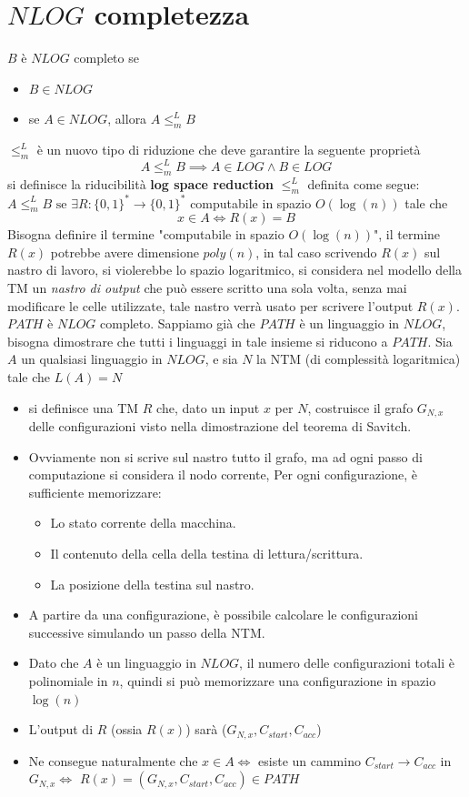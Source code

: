 \documentclass[10pt, letterpaper]{report}
\begin{document}
\section{$NLOG$ completezza}
 $B$ è $NLOG$ completo se\begin{itemize}
    \item $B\in NLOG$
    \item se $A\in NLOG$, allora $A\le_m^L B$
\end{itemize}
$\le_m^L$ è un nuovo tipo di riduzione che deve garantire la seguente proprietà
$$ A\le_m^L B\implies A\in LOG \land B\in LOG$$
 si definisce la riducibilità \textbf{log space reduction} $\le_m^L$ definita come segue:\\  
$A\le_m^L B \text{ se }\exists R:\{0,1\}^*\rightarrow \{0,1\}^*$  computabile in spazio $O(\log(n))$ tale che 
$$ x\in A \iff R(x)=B$$
Bisogna definire il termine "computabile in spazio $O(\log(n))$", il termine $R(x)$ potrebbe avere dimensione $poly(n)$, in tal caso scrivendo $R(x)$ sul nastro di lavoro, si violerebbe lo spazio logaritmico, si considera nel modello della TM un \textit{nastro di output} che può essere scritto una sola volta, senza mai modificare le celle utilizzate, tale nastro verrà usato per scrivere l'output $R(x)$.\acc 
\teo{} $PATH$ è $NLOG$ completo.\acc 
\dimo{} Sappiamo già che $PATH$ è un linguaggio in $NLOG$, bisogna dimostrare che tutti i linguaggi in tale insieme si riducono a $PATH$. Sia $A$ un qualsiasi linguaggio in $NLOG$, e sia $N$ la NTM (di complessità logaritmica) tale che $L(A)=N$\begin{itemize} \item si definisce una TM $R$ che, dato un input $x$ per $N$, costruisce il grafo $G_{N,x}$ delle configurazioni visto nella dimostrazione del teorema di Savitch. 
    \item Ovviamente non si scrive sul nastro tutto il grafo, ma ad ogni passo di computazione si considera il nodo corrente, Per ogni configurazione, è sufficiente memorizzare:\begin{itemize}
        \item Lo stato corrente della macchina.
        \item Il contenuto della cella della testina di lettura/scrittura.
        \item La posizione della testina sul nastro.\end{itemize}
        \item A partire da una configurazione, è possibile calcolare le configurazioni successive simulando un passo della NTM.
        \item Dato che $A$ è un linguaggio in $NLOG$, il numero delle configurazioni totali è polinomiale in $n$, quindi si può memorizzare una configurazione in spazio $\log(n)$
    \item L'output di $R$ (ossia $R(x)$) sarà ($G_{N,x}, C_{start}, C_{acc}$) \item Ne consegue naturalmente che $x\in A \iff$ esiste un cammino $C_{start}\rightarrow C_{acc}$ in $G_{N,x}\iff$ $R(x)=(G_{N,x}, C_{start}, C_{acc})\in PATH$
\end{itemize}
\end{document}
